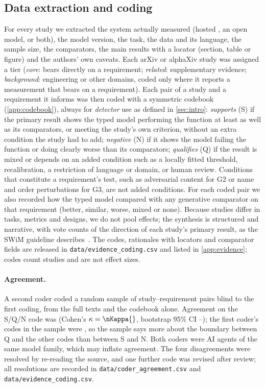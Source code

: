 \subsection{Data extraction and coding}

For every study we extracted the system actually measured (hosted \jev{}, an open model, or both), the model version, the task, the data and its language, the sample size, the comparators, the main results with a locator (section, table or figure) and the authors' own caveats.
Each arXiv or alphaXiv study was assigned a tier (\emph{core}: bears directly on a requirement; \emph{related}: supplementary evidence; \emph{background}: engineering or other domains, coded only where it reports a measurement that bears on a requirement).
Each pair of a study and a requirement it informs was then coded with a symmetric codebook (\cref{app:codebook}), always for \emph{detector} use as defined in \cref{sec:intro}:
\emph{supports} (S) if the primary result shows the typed model performing the function at least as well as its comparators, or meeting the study's own criterion, without an extra condition the study had to add;
\emph{negative} (N) if it shows the model failing the function or doing clearly worse than its comparators;
\emph{qualifies} (Q) if the result is mixed or depends on an added condition such as a locally fitted threshold, recalibration, a restriction of language or domain, or human review.
Conditions that constitute a requirement's test, such as adversarial content for G2 or name and order perturbations for G3, are not added conditions.
For each coded pair we also recorded how the typed model compared with any generative comparator on that requirement (better, similar, worse, mixed or none).
Because studies differ in tasks, metrics and designs, we do not pool effects; the synthesis is structured and narrative, with vote counts of the direction of each study's primary result, as the SWiM guideline describes~\cite{campbell2020swim}.
The codes, rationales with locators and comparator fields are released in \nolinkurl{data/evidence_coding.csv} and listed in \cref{app:evidence}; codes count studies and are not effect sizes.

\paragraph{Agreement.}
A second coder coded a random sample of \nKappaN{} study--requirement pairs blind to the first coding, from the full texts and the codebook alone.
Agreement on the S/Q/N code was \nKappaAgree{} (Cohen's $\kappa = \nKappa{}$, bootstrap 95\% CI \nKappaLo{}--\nKappaHi{}); the first coder's codes in the sample were \nKappaMarg{}, so the sample says more about the boundary between Q and the other codes than between S and N.
Both coders were AI agents of the same model family, which may inflate agreement.
The four disagreements were resolved by re-reading the source, and one further code was revised after review; all resolutions are recorded in \nolinkurl{data/coder_agreement.csv} and \nolinkurl{data/evidence_coding.csv}.

